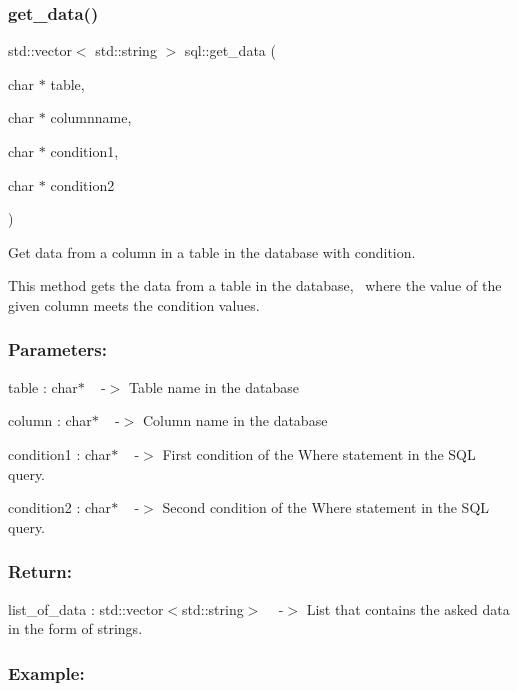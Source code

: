 \subsubsection{\texorpdfstring{get\+\_\+data()}{get\_data()}\hspace{0.1cm}{\footnotesize\ttfamily [2/2]}}
{\footnotesize\ttfamily std\+::vector$<$ std\+::string $>$ sql\+::get\+\_\+data (\begin{DoxyParamCaption}\item[{char $\ast$}]{table,  }\item[{char $\ast$}]{columnname,  }\item[{char $\ast$}]{condition1,  }\item[{char $\ast$}]{condition2 }\end{DoxyParamCaption})}



Get data from a column in a table in the database with condition. 

This method gets the data from a table in the database,~\newline
where the value of the given column meets the condition values.

\subsubsection*{Parameters\+: }

table \+: char$\ast$ ~\newline
-\/$>$ Table name in the database

column \+: char$\ast$ ~\newline
-\/$>$ Column name in the database

condition1 \+: char$\ast$ ~\newline
-\/$>$ First condition of the Where statement in the S\+QL query.

condition2 \+: char$\ast$ ~\newline
-\/$>$ Second condition of the Where statement in the S\+QL query.

\subsubsection*{Return\+: }

list\+\_\+of\+\_\+data \+: std\+::vector$<$std\+::string$>$ ~\newline
-\/$>$ List that contains the asked data in the form of strings.

\subsubsection*{Example\+: }

